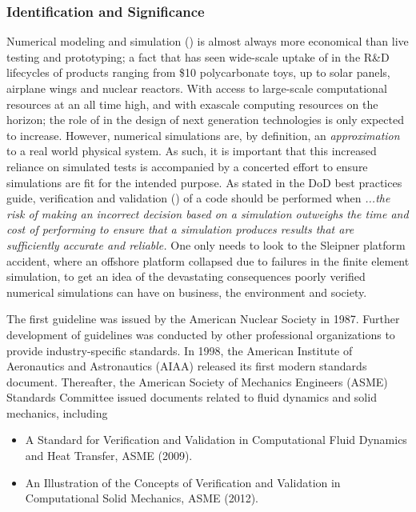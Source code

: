 \subsubsection{Identification and Significance}
\label{intro}
Numerical modeling and simulation (\MS) is almost always more economical than live testing and prototyping; a fact that has seen wide-scale uptake of \MS in the R\&D lifecycles of products ranging from \$10 polycarbonate toys, up to solar panels, airplane wings and nuclear reactors. With access to large-scale computational resources at an all time high, and with exascale computing resources on the horizon; the role of \MS in the design of next generation technologies is only expected to increase. However, numerical simulations are, by definition, an \emph{approximation} to a real world physical system. As such, it is important that this increased reliance on simulated tests is accompanied by a concerted effort to ensure simulations are fit for the intended purpose.  As stated in the DoD best practices guide, verification and validation (\VV) of a code should be performed when  \emph{...the risk of making an incorrect decision based on a simulation outweighs the time and cost of performing \VV to ensure that a simulation produces results that are sufficiently accurate and reliable.} One only needs to look to the Sleipner platform accident, where an offshore platform collapsed due to failures in the finite element simulation, to get an idea of the devastating consequences poorly verified numerical simulations can have on business, the environment and society.

The first \VV guideline was issued by the American Nuclear Society in 1987. Further development of \VV guidelines was conducted by other professional organizations to provide industry-specific standards. In 1998, the American Institute of Aeronautics and Astronautics (AIAA) released its first modern standards document. Thereafter, the American Society of Mechanics Engineers (ASME) \VV Standards Committee issued documents related to fluid dynamics and solid mechanics, including
\begin{itemize}
 \item A Standard for Verification and Validation in Computational Fluid Dynamics and Heat Transfer, ASME  (2009).
 \item An Illustration of the Concepts of Verification and Validation in Computational Solid Mechanics, ASME  (2012). 
\end{itemize}

